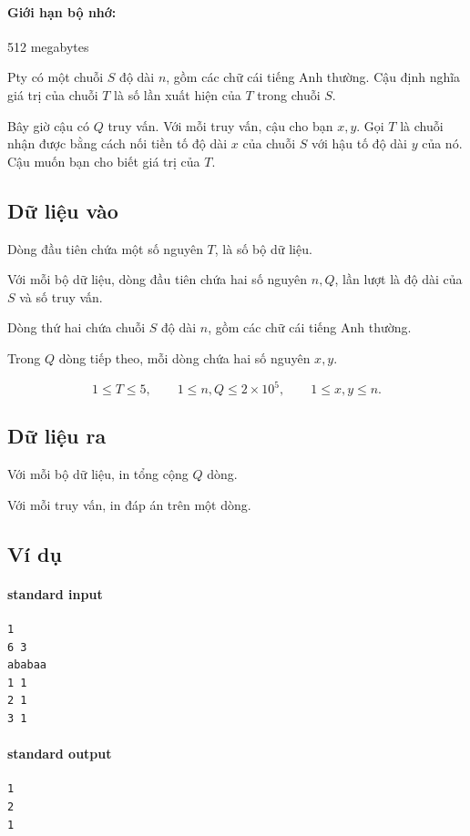 \documentclass[11pt]{article}
\begin{document}
\paragraph{Giới hạn bộ nhớ:} 512 megabytes

Pty có một chuỗi \(S\) độ dài \(n\), gồm các chữ cái tiếng Anh thường. Cậu
định nghĩa giá trị của chuỗi \(T\) là số lần xuất hiện của \(T\) trong chuỗi
\(S\).

Bây giờ cậu có \(Q\) truy vấn. Với mỗi truy vấn, cậu cho bạn \(x,y\). Gọi
\(T\) là chuỗi nhận được bằng cách nối tiền tố độ dài \(x\) của chuỗi \(S\)
với hậu tố độ dài \(y\) của nó. Cậu muốn bạn cho biết giá trị của \(T\).

\subsection*{Dữ liệu vào}

Dòng đầu tiên chứa một số nguyên \(T\), là số bộ dữ liệu.

Với mỗi bộ dữ liệu, dòng đầu tiên chứa hai số nguyên \(n,Q\), lần lượt là độ
dài của \(S\) và số truy vấn.

Dòng thứ hai chứa chuỗi \(S\) độ dài \(n\), gồm các chữ cái tiếng Anh thường.

Trong \(Q\) dòng tiếp theo, mỗi dòng chứa hai số nguyên \(x,y\).

\[
  1\le T\le 5,\qquad
  1\le n,Q\le 2\times 10^5,\qquad
  1\le x,y\le n.
\]

\subsection*{Dữ liệu ra}

Với mỗi bộ dữ liệu, in tổng cộng \(Q\) dòng.

Với mỗi truy vấn, in đáp án trên một dòng.

\subsection*{Ví dụ}

\paragraph{standard input}
\begin{verbatim}
1
6 3
ababaa
1 1
2 1
3 1
\end{verbatim}

\paragraph{standard output}
\begin{verbatim}
1
2
1
\end{verbatim}
\end{document}
